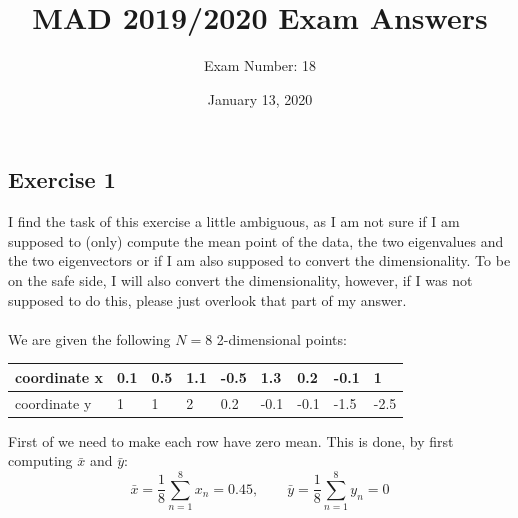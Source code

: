 \documentclass{report}
\title{MAD 2019/2020 Exam Answers}
\author{Exam Number: 18}
\date{January 13, 2020}
\begin{document}
\maketitle

\subsection*{Exercise 1}
I find the task of this exercise a little ambiguous, as I am not sure if I am supposed to (only) compute the mean point of the data, the two eigenvalues and the two eigenvectors or if I am also supposed to convert the dimensionality. To be on the safe side, I will also convert the dimensionality, however, if I was not supposed to do this, please just overlook that part of my answer. \\
\\
We are given the following $N = 8$ 2-dimensional points:
\begin{center}
    \begin{tabular}{|l|l|l|l|l|l|l|l|l|}
        \hline
        coordinate x & 0.1 & 0.5 & 1.1 & -0.5 & 1.3 & 0.2 & -0.1 & 1 \\
        \hline
        coordinate y & 1 & 1 & 2 & 0.2 & -0.1 & -0.1 & -1.5 & -2.5 \\
        \hline
    \end{tabular}
\end{center}
First of we need to make each row have zero mean. This is done, by first computing $\bar{x}$ and $\bar{y}$:
$$\bar{x} = \frac{1}{8} \sum^8 _{n = 1} x_n = 0.45, \quad \quad \bar{y} = \frac{1}{8} \sum^8 _{n = 1} y_n = 0$$
\end{document}
